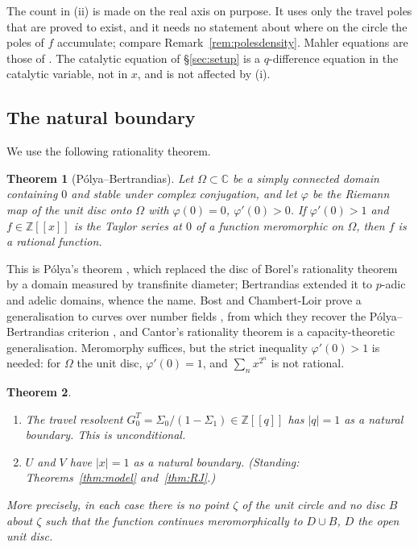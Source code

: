 \documentclass[11pt]{article}
\theoremstyle{plain}
\newtheorem{theorem}{Theorem}
\theoremstyle{definition}
\theoremstyle{remark}
\newcommand{\Z}{\mathbb{Z}}
\newcommand{\C}{\mathbb{C}}
\begin{document}
\noindent The count in (ii) is made on the real axis on purpose. It uses only the travel poles that
are proved to exist, and it needs no statement about where on the circle the poles of $f$
accumulate; compare Remark~\ref{rem:polesdensity}. Mahler equations are those of
\cite{Nishioka1996}. The catalytic equation of \S\ref{sec:setup} is a $q$-difference equation in
the catalytic variable, not in $x$, and is not affected by (i).

\subsection{The natural boundary}

We use the following rationality theorem.

\begin{theorem}[P\'olya--Bertrandias]\label{thm:PB}
Let $\Omega\subset\C$ be a simply connected domain containing $0$ and stable under complex
conjugation, and let $\varphi$ be the Riemann map of the unit disc onto $\Omega$ with
$\varphi(0)=0$, $\varphi'(0)>0$. If $\varphi'(0)>1$ and $f\in\Z[[x]]$ is the Taylor series at $0$ of
a function meromorphic on $\Omega$, then $f$ is a rational function.
\end{theorem}

\noindent This is P\'olya's theorem \cite{Polya1928}, which replaced the disc of Borel's
rationality theorem by a domain measured by transfinite diameter; Bertrandias
\cite{Bertrandias1964} extended it to $p$-adic and adelic domains, whence the name. Bost and
Chambert-Loir prove a generalisation to curves over number fields
\cite[Thm.~7.9]{BostChambertLoir2009}, from which they recover the P\'olya--Bertrandias criterion
\cite[Example~7.10]{BostChambertLoir2009}, and Cantor's rationality theorem
\cite[Thm.~5.2.2]{Cantor1980} is a capacity-theoretic generalisation. Meromorphy suffices, but the strict
inequality $\varphi'(0)>1$ is needed: for $\Omega$ the unit disc, $\varphi'(0)=1$, and
$\sum_nx^{2^n}$ is not rational.

\begin{theorem}\label{thm:natboundary}
\begin{enumerate}[label=\textup{(\alph*)},leftmargin=2.2em,itemsep=0.1em,topsep=0.2em]
\item The travel resolvent $G^T_0=\Sigma_0/(1-\Sigma_1)\in\Z[[q]]$ has $|q|=1$ as a natural
boundary. This is unconditional.
\item $U$ and $V$ have $|x|=1$ as a natural boundary. \textup{(}Standing: Theorems~\ref{thm:model}
and~\ref{thm:RJ}.\textup{)}
\end{enumerate}
More precisely, in each case there is no point $\zeta$ of the unit circle and no disc $B$ about
$\zeta$ such that the function continues meromorphically to $D\cup B$, $D$ the open unit disc.
\end{theorem}
\end{document}
